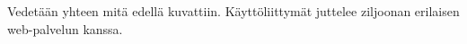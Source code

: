 Vedetään yhteen mitä edellä kuvattiin. Käyttöliittymät juttelee ziljoonan erilaisen web-palvelun kanssa.